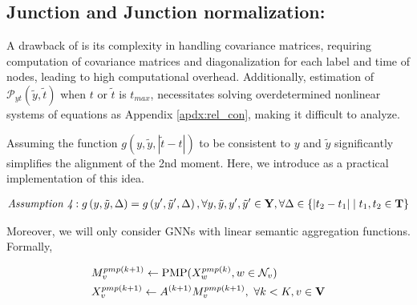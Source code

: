 \subsection{Junction and Junction normalization: \JJnorm}
A drawback of \PNY is its complexity in handling covariance matrices, requiring computation of covariance matrices and diagonalization for each label and time of nodes, leading to high computational overhead. Additionally, estimation of $\mathcal{P}_{yt}\left(\tilde{y},\tilde{t}\right)$ when $t$ or $\tilde{t}$ is $t_{max}$, necessitates solving overdetermined nonlinear systems of equations as Appendix \ref{apdx:rel_con}, making it difficult to analyze.

Assuming the function $g\left(y, \tilde{y}, |\tilde{t}-t|\right)$ to be consistent to $y$ and $\tilde{y}$ significantly simplifies the alignment of the 2nd moment. Here, we introduce \JJnorm as a practical implementation of this idea.


\vspace{-15pt}
\begin{align}\label{assumption4}
    \textit{Assumption 4}: g\left(y, \tilde{y}, \Delta \right) = g\left(y', \tilde{y}', \Delta \right) , \forall y, \tilde{y}, y', \tilde{y}' \in \bold{Y}, \forall\Delta \in \{|t_2 -t_1 | \mid t_1, t_2\in \bold{T}\}
\end{align}

\vspace{-5pt}

Moreover, we will only consider GNNs with linear semantic aggregation functions. Formally,

\vspace{-15pt}

\begin{align}
&M_v^{pmp(k+1)} \leftarrow \text{{$\textrm{PMP}$}}(X_w^{pmp(k)},w\in \mathcal{N}_v)\\
&X_v^{pmp(k+1)} \leftarrow A^{(k+1)}M_v^{pmp(k+1)}, \ \forall k<K, v\in \bold{V}
\end{align}

\vspace{-5pt}


